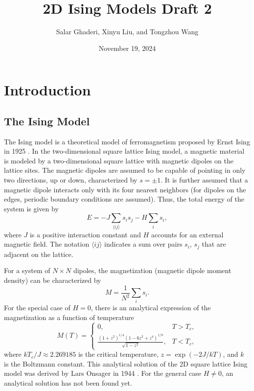 \documentclass[11pt]{article}
\title{2D Ising Models Draft 2}
\author{Salar Ghaderi, Xinyu Liu, and Tongzhou Wang}
\date{November 19, 2024}
\begin{document}
\maketitle


\section{Introduction}

\subsection{The Ising Model}
The Ising model is a theoretical model of ferromagnetism proposed by Ernst Ising in 1925 \cite{ising1925contribution, kramers1941statistics}. In the two-dimensional square lattice Ising model, a magnetic material is modeled by a two-dimensional square lattice with magnetic dipoles on the lattice sites. The magnetic dipoles are assumed to be capable of pointing in only two directions, up or down, characterized by $s = \pm 1$. It is further assumed that a magnetic dipole interacts only with its four nearest neighbors (for dipoles on the edges, periodic boundary conditions are assumed). Thus, the total energy of the system is given by
\begin{equation}
    E = -J \sum_{\langle ij \rangle} s_i s_j - H \sum_{i} s_i,
\end{equation}
where $J$ is a positive interaction constant and $H$ accounts for an external magnetic field. The notation $\langle ij \rangle$ indicates a sum over pairs $s_i$, $s_j$ that are adjacent on the lattice.

For a system of $N \times N$ dipoles, the magnetization (magnetic dipole moment density) can be characterized by
\begin{equation}
    M = \frac{1}{N^2}\sum_{i} s_i.
\end{equation}
For the special case of $H = 0$, there is an analytical expression of the magnetization as a function of temperature
\begin{equation}
    M(T) = \begin{cases}
            0, & T > T_c, \\
            \frac{(1 + z^2)^{1/4} (1 - 6z^2 + z^4)^{1/8}}{\sqrt{1-z^2}}, & T < T_c,
    \end{cases}
\end{equation}
where $kT_c / J \approx 2.269185$ is the critical temperature, $z = \exp(-2J/kT)$, and $k$ is the Boltzmann constant. This analytical solution of the 2D square lattice Ising model was derived by Lars Onsager in 1944 \cite{onsager1944crystal}. For the general case $H \neq 0$, an analytical solution has not been found yet.
\end{document}
